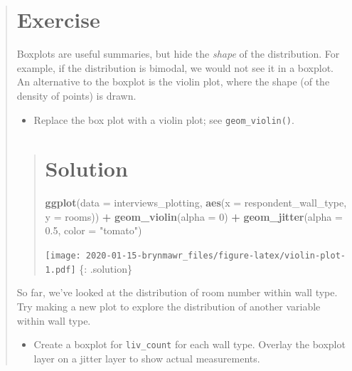 \documentclass[]{book}
\newenvironment{Shaded}{\begin{snugshade}}{\end{snugshade}}
\newcommand{\KeywordTok}[1]{\textcolor[rgb]{0.13,0.29,0.53}{\textbf{#1}}}
\newcommand{\DataTypeTok}[1]{\textcolor[rgb]{0.13,0.29,0.53}{#1}}
\newcommand{\DecValTok}[1]{\textcolor[rgb]{0.00,0.00,0.81}{#1}}
\newcommand{\FloatTok}[1]{\textcolor[rgb]{0.00,0.00,0.81}{#1}}
\newcommand{\StringTok}[1]{\textcolor[rgb]{0.31,0.60,0.02}{#1}}
\newcommand{\OperatorTok}[1]{\textcolor[rgb]{0.81,0.36,0.00}{\textbf{#1}}}
\newcommand{\NormalTok}[1]{#1}
\providecommand{\tightlist}{%
  \setlength{\itemsep}{0pt}\setlength{\parskip}{0pt}}
\begin{document}
\begin{quote}
\section{Exercise}\label{exercise-13}

Boxplots are useful summaries, but hide the \emph{shape} of the
distribution. For example, if the distribution is bimodal, we would not
see it in a boxplot. An alternative to the boxplot is the violin plot,
where the shape (of the density of points) is drawn.

\begin{itemize}
\tightlist
\item
  Replace the box plot with a violin plot; see \texttt{geom\_violin()}.
\end{itemize}

\begin{quote}
\section{Solution}\label{solution-17}

\begin{Shaded}
\begin{Highlighting}[]
\KeywordTok{ggplot}\NormalTok{(}\DataTypeTok{data =}\NormalTok{ interviews_plotting, }\KeywordTok{aes}\NormalTok{(}\DataTypeTok{x =}\NormalTok{ respondent_wall_type, }\DataTypeTok{y =}\NormalTok{ rooms)) }\OperatorTok{+}
\StringTok{  }\KeywordTok{geom_violin}\NormalTok{(}\DataTypeTok{alpha =} \DecValTok{0}\NormalTok{) }\OperatorTok{+}
\StringTok{  }\KeywordTok{geom_jitter}\NormalTok{(}\DataTypeTok{alpha =} \FloatTok{0.5}\NormalTok{, }\DataTypeTok{color =} \StringTok{"tomato"}\NormalTok{)}
\end{Highlighting}
\end{Shaded}

\texttt{[image: 2020-01-15-brynmawr\_files/figure-latex/violin-plot-1.pdf]}
\{: .solution\}
\end{quote}

So far, we've looked at the distribution of room number within wall
type. Try making a new plot to explore the distribution of another
variable within wall type.

\begin{itemize}
\tightlist
\item
  Create a boxplot for \texttt{liv\_count} for each wall type. Overlay
  the boxplot layer on a jitter layer to show actual measurements.
\end{itemize}


\end{quote}
\end{document}
